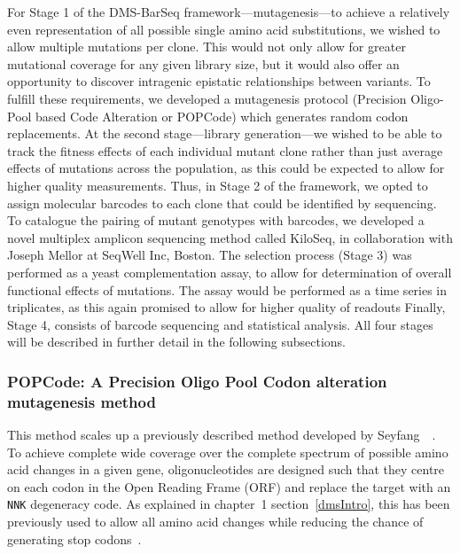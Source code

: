 For Stage 1 of the DMS-BarSeq framework---mutagenesis---to achieve a relatively even representation of all possible single amino acid substitutions, we wished to allow multiple mutations per clone. This would not only allow for greater mutational coverage for any given library size, but it would also offer an opportunity to discover intragenic epistatic relationships between variants.  To fulfill these requirements, we developed a mutagenesis protocol (Precision Oligo-Pool based Code Alteration or POPCode) which generates random codon replacements. 
At the second stage---library generation---we wished to be able to track the fitness effects of each individual mutant clone rather than just average effects of mutations across the population, as this could be expected to allow for higher quality measurements. Thus, in Stage 2 of the framework, we opted to assign molecular barcodes to each clone that could be identified by sequencing. To catalogue the pairing of mutant genotypes with barcodes, we developed a novel multiplex amplicon sequencing method called KiloSeq, in collaboration with Joseph Mellor at SeqWell Inc, Boston. 
The selection process (Stage 3) was performed as a yeast complementation assay, to allow for determination of overall functional effects of mutations. The assay would be performed as a time series in triplicates, as this again promised to allow for higher quality of readouts 
Finally, Stage 4, consists of barcode sequencing and statistical analysis. All four stages will be described in further detail in the following subsections.


\subsubsection{POPCode: A Precision Oligo Pool Codon alteration mutagenesis method}

This method scales up a previously described method developed by Seyfang~\etal~\cite{seyfang_multiple_2004}. To achieve complete wide coverage over the complete spectrum of possible amino acid changes in a given gene, oligonucleotides are designed such that they centre on each codon in the Open Reading Frame (ORF) and replace the target with an \texttt{NNK} degeneracy code. As explained in chapter~1 section~\ref{dmsIntro}, this has been previously used to allow all amino acid changes while reducing the chance of generating stop codons~\cite{pal_methods_2005}. 


